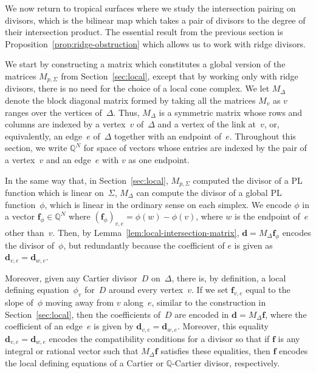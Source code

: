 \documentclass[11pt]{amsart}
\theoremstyle{definition}
\newcommand{\bff}{\mathbf f}
\newcommand{\QQ}{\mathbb Q}
\begin{document}
We now return to tropical surfaces where we study the intersection pairing on
divisors, which is the bilinear map which takes a pair of divisors to the degree
of their intersection product.
The essential result from the previous
section is Proposition~\ref{prop:ridge-obstruction} which allows us to work with
ridge divisors.

We start by constructing a matrix which constitutes a global version of the
matrices $M_{p, \Sigma}$ from Section~\ref{sec:local}, except that by working
only with ridge divisors, there is no need for the choice of a local cone
complex. We let $M_\Delta$ denote the block diagonal matrix formed by taking all
the matrices $M_v$ as $v$ ranges over the vertices of~$\Delta$. Thus, $M_\Delta$
is a symmetric matrix whose rows and columns are indexed by a vertex~$v$
of~$\Delta$ and a vertex of the link at~$v$, or, equivalently, an edge~$e$
of~$\Delta$ together with an endpoint of~$e$. Throughout this section, we
write $\QQ^N$ for space of vectors whose entries are indexed by the pair of a
vertex~$v$ and an edge~$e$ with $v$ as one endpoint.

In the same way that, in Section~\ref{sec:local}, $M_{p,\Sigma}$ computed the
divisor of a PL function which is linear on~$\Sigma$, $M_\Delta$ can compute the
divisor of a global PL function~$\phi$, which is linear in the ordinary sense on
each simplex. We encode $\phi$ in a vector $\bff_\phi \in \QQ^N$ where
$(\bff_\phi)_{v, e} = \phi(w) - \phi(v)$, where $w$ is the endpoint of~$e$ other
than~$v$. Then, by Lemma~\ref{lem:local-intersection-matrix}, $\mathbf d = M_\Delta \bff_{\phi}$ encodes the divisor of~$\phi$,
but redundantly because the coefficient of $e$ is given as $\mathbf d_{v,e} =
\mathbf d_{w,e}$.

Moreover, given any Cartier divisor~$D$ on~$\Delta$, there is, by definition, a
local defining equation~$\phi_v$ for~$D$ around every vertex~$v$. If we set
$\bff_{v, e}$ equal to the slope of~$\phi$ moving away from $v$ along~$e$,
similar to the construction in Section~\ref{sec:local}, then the coefficients
of~$D$ are encoded in $\mathbf d = M_\Delta \bff$, where the coefficient of an
edge~$e$ is given by $\mathbf d_{v,e} = \mathbf d_{w,e}$. Moreover, this
equality $\mathbf d_{v,e} = \mathbf d_{w,e}$ encodes the compatibility
conditions for a divisor so that if $\bff$ is any integral or rational vector
such that $M_\Delta \bff$ satisfies these equalities, then $\bff$ encodes the
local defining equations of a Cartier or $\QQ$-Cartier divisor, respectively.
\end{document}
